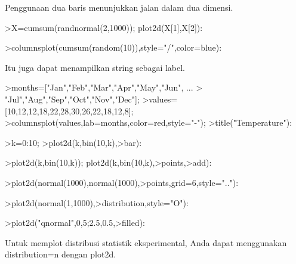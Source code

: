 \documentclass{article}
\begin{document}
\begin{eulernotebook}
\begin{eulercomment}
\begin{eulercomment}
\begin{eulercomment}
\begin{eulercomment}
\begin{eulercomment}
\begin{eulercomment}
\begin{eulercomment}
\begin{eulercomment}
\begin{eulercomment}
\begin{eulercomment}
\begin{eulercomment}
\begin{eulercomment}
\begin{eulercomment}
Penggunaan dua baris menunjukkan jalan dalam dua dimensi.
\end{eulercomment}
\begin{eulerprompt}
>X=cumsum(randnormal(2,1000)); plot2d(X[1],X[2]):
\end{eulerprompt}
\begin{eulerprompt}
>columnsplot(cumsum(random(10)),style="/",color=blue):
\end{eulerprompt}
\begin{eulercomment}
Itu juga dapat menampilkan string sebagai label.
\end{eulercomment}
\begin{eulerprompt}
>months=["Jan","Feb","Mar","Apr","May","Jun", ...
>  "Jul","Aug","Sep","Oct","Nov","Dec"];
>values=[10,12,12,18,22,28,30,26,22,18,12,8];
>columnsplot(values,lab=months,color=red,style="-");
>title("Temperature"):
\end{eulerprompt}
\begin{eulerprompt}
>k=0:10;
>plot2d(k,bin(10,k),>bar):
\end{eulerprompt}
\begin{eulerprompt}
>plot2d(k,bin(10,k)); plot2d(k,bin(10,k),>points,>add):
\end{eulerprompt}
\begin{eulerprompt}
>plot2d(normal(1000),normal(1000),>points,grid=6,style=".."):
\end{eulerprompt}
\begin{eulerprompt}
>plot2d(normal(1,1000),>distribution,style="O"):
\end{eulerprompt}
\begin{eulerprompt}
>plot2d("qnormal",0,5;2.5,0.5,>filled):
\end{eulerprompt}
\begin{eulercomment}
Untuk memplot distribusi statistik eksperimental, Anda dapat
menggunakan distribution=n dengan plot2d.
\end{eulercomment}
\begin{eulerprompt}

\end{eulerprompt}
\end{eulercomment}
\end{eulercomment}
\end{eulercomment}
\end{eulercomment}
\end{eulercomment}
\end{eulercomment}
\end{eulercomment}
\end{eulercomment}
\end{eulercomment}
\end{eulercomment}
\end{eulercomment}
\end{eulercomment}
\end{eulernotebook}
\end{document}
